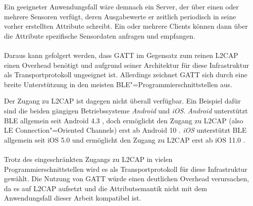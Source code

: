 Ein geeigneter Anwendungsfall wäre demnach ein Server, der über einen oder mehrere Sensoren verfügt, deren Ausgabewerte er zeitlich periodisch in seine vorher erstellten Attribute schreibt. Ein oder mehrere Clients können dann über die Attribute spezifische Sensordaten anfragen und empfangen.
\\\\
Daraus kann gefolgert werden, dass GATT im Gegensatz zum reinen L2CAP einen Overhead benötigt und aufgrund seiner Architektur für diese Infrastruktur als Transportprotokoll ungeeignet ist. Allerdings zeichnet GATT sich durch eine breite Unterstützung in den meisten BLE"=Programmierschnittstellen aus.

Der Zugang zu L2CAP ist dagegen nicht überall verfügbar. Ein Beispiel dafür sind die beiden gängigen Betriebssysteme \textit{Android} und \textit{iOS}. \textit{Android} unterstützt BLE allgemein seit Android 4.3 \cite{AndroidAppLayerSec}, doch ermöglicht den Zugang zu L2CAP (also LE Connection"=Oriented Channels) erst ab Android 10 \cite{AndroidCoC}. \textit{iOS} unterstützt BLE allgemein seit iOS 5.0 \cite{iOS_coreBluetooth} und ermöglicht den Zugang zu L2CAP erst ab iOS 11.0 \cite{iOS_CBL2CAPChannel}.
\\\\
Trotz des eingeschränkten Zugangs zu L2CAP in vielen Programmierschnittstellen wird es als Transportprotokoll für diese Infrastruktur gewählt. Die Nutzung von GATT würde einen deutlichen Overhead verursachen, da es auf L2CAP aufsetzt und die Attributsemantik nicht mit dem Anwendungsfall dieser Arbeit kompatibel ist.